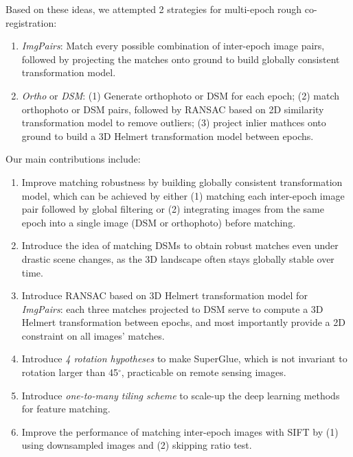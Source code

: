 Based on these ideas, we attempted 2 strategies for multi-epoch rough co-registration:\\
\begin{enumerate}
    \item \textit{ImgPairs}: Match every possible combination of inter-epoch image pairs, followed by projecting the matches onto ground to build globally consistent transformation model.
    \item \textit{Ortho} or \textit{DSM}: (1) Generate orthophoto or DSM for each epoch; (2) match orthophoto or DSM pairs, followed by RANSAC based on 2D similarity transformation model to remove outliers; (3) project inlier mathces onto ground to build a 3D Helmert transformation model between epochs. 
\end{enumerate}

Our main contributions include:\\
\begin{enumerate}
	\item Improve matching robustness by building globally consistent transformation model, which can be achieved by either (1) matching each inter-epoch image pair followed by global filtering or (2) integrating images from the same epoch into a single image (DSM or orthophoto) before matching.
	\item Introduce the idea of matching DSMs to obtain robust matches even under drastic scene changes, as the 3D landscape often stays globally stable over time.
	\item Introduce RANSAC based on 3D Helmert transformation model for \textit{ImgPairs}: each three matches projected to DSM serve to compute a 3D Helmert transformation between epochs, and most importantly provide a 2D constraint on all images’ matches.
	\item Introduce \textit{4 rotation hypotheses} to make SuperGlue, which is not invariant to rotation larger than 45$^\circ$, practicable on remote sensing images.
	\item Introduce \textit{one-to-many tiling scheme} to scale-up the deep learning methods for feature matching.
	\item Improve the performance of matching inter-epoch images with SIFT by (1) using downsampled images and (2) skipping ratio test.%
\end{enumerate}



